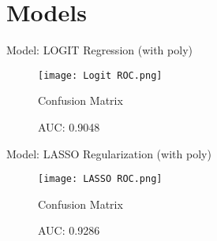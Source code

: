 \documentclass[notes,compress,serif,professionalfont]{beamer}
\begin{document}
\section{Models}

\begin{frame}{Model: LOGIT Regression (with poly)}
    \begin{figure}
        \centering
        \begin{minipage}{.5\textwidth}
            \centering
            \texttt{[image: Logit ROC.png]}
        \end{minipage}%
        \begin{minipage}{.5\textwidth}
            \caption*{Confusion Matrix}
            \begin{table}
            \centering
            \end{table}
        \end{minipage}
    \caption{AUC: 0.9048}
    \end{figure}
\end{frame}

\begin{frame}{Model: LASSO Regularization (with poly)}
    \begin{figure}
        \centering
        \begin{minipage}{.5\textwidth}
            \centering
            \texttt{[image: LASSO ROC.png]}
        \end{minipage}%
        \begin{minipage}{.5\textwidth}
            \caption*{Confusion Matrix}
            \begin{table}
            \centering
            \end{table}
        \end{minipage}
    \caption{AUC: 0.9286}
    \end{figure}
\end{frame}
\end{document}
